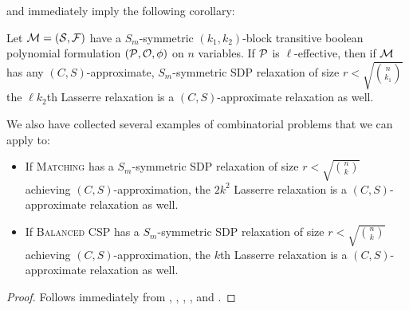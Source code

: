  and  immediately imply the following corollary:
\begin{corollary}\label{cor:lass-optimal}
Let $\mathcal M = (\mathcal S, \mathcal F)$ have a $S_m$-symmetric $(k_1,k_2)$-block transitive boolean polynomial formulation $(\mathcal P, \mathcal O, \phi)$ on $n$ variables. If $\mathcal P$ is $\ell$-effective, then if $\mathcal M$ has any $(C,S)$-approximate, $S_m$-symmetric SDP relaxation of size $r < \sqrt{\binom{n}{k_1}}$ the $\ell k_2$th Lasserre relaxation is a $(C,S)$-approximate relaxation as well.
\end{corollary}
We also have collected several examples of combinatorial problems that we can apply  to:
\begin{corollary}\label{cor:matching_bcsp_optimal}
\leavevmode
\begin{itemize}
\item If \textsc{Matching} has a $S_m$-symmetric SDP relaxation of size $r < \sqrt{\binom{n}{k}}$ achieving $(C,S)$-approximation, the $2k^2$ Lasserre relaxation is a $(C,S)$-approximate relaxation as well.
\item If \textsc{Balanced CSP} has a $S_m$-symmetric SDP relaxation of size $r < \sqrt{\binom{n}{k}}$ achieving $(C,S)$-approximation, the $k$th Lasserre relaxation is a $(C,S)$-approximate relaxation as well.
\end{itemize}
\end{corollary}
\begin{proof}
Follows immediately from , , , , and .
\end{proof}

